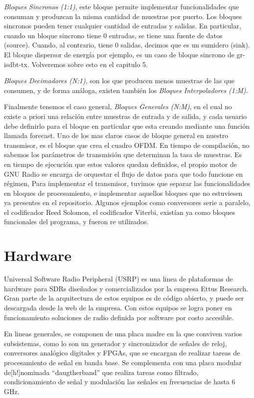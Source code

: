 \textit{Bloques Sincronos (1:1)}, este bloque permite implementar funcionalidades que consuman y produzcan la misma cantidad de muestras por puerto. Los bloques sincronos pueden tener cualquier cantidad de entradas y salidas. En particular, cuando un bloque sincrono tiene 0 entradas, se tiene una fuente de datos (source). Cuando, al contrario, tiene 0 salidas, decimos que es un sumidero (sink). El bloque dispersor de energía por ejemplo, es un caso de bloque sincrono de gr-isdbt-tx. Volveremos sobre esto en el capitulo 5.

\textit{Bloques Decimadores (N:1)}, son los que producen menos muestras de las que consumen, y de forma análoga, existen también los \textit{Bloques Interpoladores (1:M)}.

Finalmente tenemos el caso general, \textit{Bloques Generales (N:M)}, en el cual no existe a priori una relación entre muestras de entrada y de salida, y cada usuario debe definirlo para el bloque en particular que esta creando mediante una función llamada forecast. Uno de los mas claros casos de bloque general en nuestro transmisor, es el bloque que crea el cuadro OFDM. En tiempo de compilación, no sabemos los parámetros de transmisión que determinan la tasa de muestras. Es en tiempo de ejecución que estos valores quedan definidos, el propio motor de GNU Radio se encarga de orquestar el flujo de datos para que todo funcione en régimen, 
Para implementar el transmisor, tuvimos que separar las funcionalidades en bloques de procesamiento, e implementar aquellos bloques que no estuviesen ya presentes en el repositorio. Algunos ejemplos como conversores serie a paralelo, el codificador Reed Solomon, el codificador Viterbi, existían ya como bloques funcionales del programa, y fueron re utilizados. 

\section{Hardware}
Universal Software Radio Peripheral (USRP) es una linea de plataformas de hardware para SDRs diseñados y comercializados por la empresa Ettus Research. Gran parte de la arquitectura de estos equipos es de código abierto, y puede ser descargada desde la web de la empresa. Con estos equipos se logra poner en funcionamiento soluciones de radio definida por software por costo accesible. 

En lineas generales, se componen de una placa madre en la que conviven varios subsistemas, como lo son un generador y sincronizador de señales de reloj, conversores analógico digitales y FPGAs, que se encargan de realizar tareas de procesamiento de señal en banda base. Se complementa con una placa modular de[h!]nominada “daugtherband” que realiza tareas como filtrado, condicionamiento de señal y modulación las señales en frecuencias de hasta 6 GHz.

